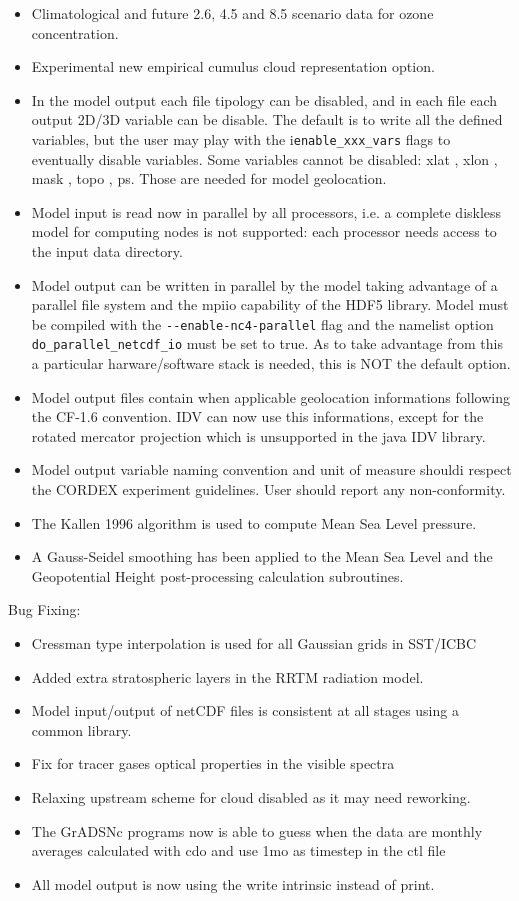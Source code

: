 \begin{itemize}
  \item Climatological and future 2.6, 4.5 and 8.5 scenario data for ozone
   concentration.
  \item Experimental new empirical cumulus cloud representation option.
  \item In the model output each file tipology can be disabled, and in each file
   each output 2D/3D variable can be disable. The default is to write all the
   defined variables, but the user may play with the i\verb=enable_xxx_vars=
   flags to eventually disable variables.
   Some variables cannot be disabled: xlat , xlon , mask , topo , ps.
   Those are needed for model geolocation.
  \item Model input is read now in parallel by all processors, i.e. a complete
   diskless model for computing nodes is not supported: each processor needs
   access to the input data directory.
  \item Model output can be written in parallel by the model taking advantage
    of a parallel file system and the mpiio capability of the HDF5 library.
    Model must be compiled with the \verb=--enable-nc4-parallel= flag and the
    namelist option \verb=do_parallel_netcdf_io= must be set to true.
    As to take advantage from this a particular harware/software stack is
    needed, this is NOT the default option.
  \item Model output files contain when applicable geolocation informations
   following the CF-1.6 convention. IDV can now use this informations, except
   for the rotated mercator projection which is unsupported in the java IDV
   library.
  \item Model output variable naming convention and unit of measure shouldi
    respect the CORDEX experiment guidelines. User should report any
    non-conformity.
  \item The Kallen 1996 algorithm is used to compute Mean Sea Level pressure.
  \item A Gauss-Seidel smoothing has been applied to the Mean Sea Level and the
   Geopotential Height post-processing calculation subroutines.
\end{itemize}
Bug Fixing:
\begin{itemize}
  \item Cressman type interpolation is used for all Gaussian grids in SST/ICBC
  \item Added extra stratospheric layers in the RRTM radiation model.
  \item Model input/output of netCDF files is consistent at all stages using a
   common library.
  \item Fix for tracer gases optical properties in the visible spectra
  \item Relaxing upstream scheme for cloud disabled as it may need reworking.
  \item The GrADSNc programs now is able to guess when the data are monthly
    averages calculated with cdo and use 1mo as timestep in the ctl file
  \item All model output is now using the write intrinsic instead of print.
\end{itemize}

